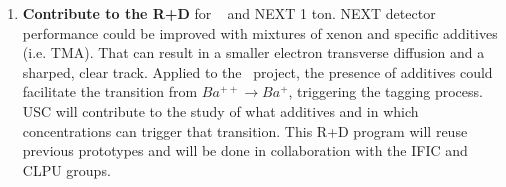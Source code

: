 \begin{enumerate}
\item {\bf Contribute to the R+D} for \BATA~ and NEXT 1 ton. NEXT detector performance could be improved with mixtures of xenon and specific additives (i.e. TMA). That can result in a smaller electron transverse diffusion and a sharped, clear track. Applied to the \BATA ~project, the presence of additives could facilitate the transition from $Ba^{++} \to Ba^+$, triggering the tagging process. USC will contribute to the study of what additives and in which concentrations can trigger that transition. This R+D program will reuse previous prototypes and will be done in collaboration with the IFIC and CLPU groups.
\end{enumerate}
